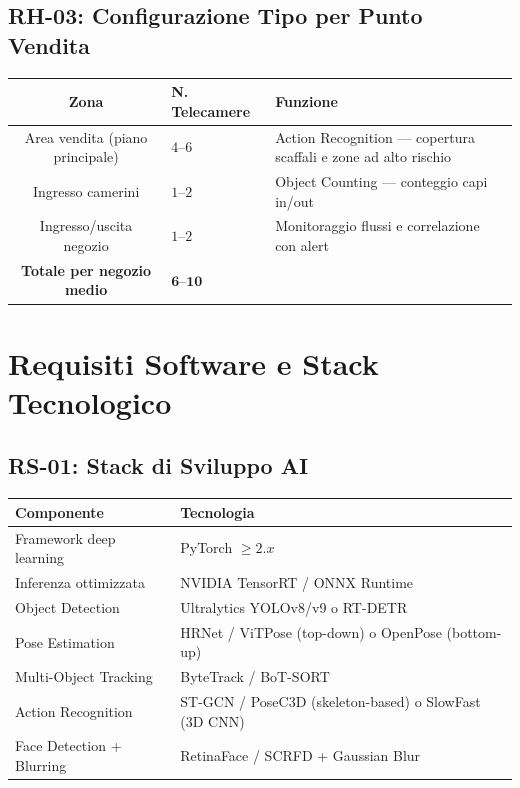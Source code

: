 \documentclass[a4paper, 12pt]{article}
\begin{document}
\subsection{RH-03: Configurazione Tipo per Punto Vendita}

\begin{tabularx}{\textwidth}{clL}
    \toprule
    \textbf{Zona} & \textbf{N. Telecamere} & \textbf{Funzione} \\
    \midrule
    Area vendita (piano principale) & $4\text{--}6$ & Action Recognition — copertura scaffali e zone ad alto rischio \\
    Ingresso camerini & $1\text{--}2$ & Object Counting — conteggio capi in/out \\
    Ingresso/uscita negozio & $1\text{--}2$ & Monitoraggio flussi e correlazione con alert \\
    \midrule
    \textbf{Totale per negozio medio} & $\mathbf{6\text{--}10}$ & \\
    \bottomrule
\end{tabularx}

\section{Requisiti Software e Stack Tecnologico}

\subsection{RS-01: Stack di Sviluppo AI}

\begin{tabularx}{\textwidth}{lL}
    \toprule
    \textbf{Componente} & \textbf{Tecnologia} \\
    \midrule
    Framework deep learning & PyTorch $\geq 2.x$ \\
    Inferenza ottimizzata & NVIDIA TensorRT / ONNX Runtime \\
    Object Detection & Ultralytics YOLOv8/v9 o RT-DETR \\
    Pose Estimation & HRNet / ViTPose (top-down) o OpenPose (bottom-up) \\
    Multi-Object Tracking & ByteTrack / BoT-SORT \\
    Action Recognition & ST-GCN / PoseC3D (skeleton-based) o SlowFast (3D CNN) \\
    Face Detection + Blurring & RetinaFace / SCRFD + Gaussian Blur \\
    \bottomrule
\end{tabularx}
\end{document}
